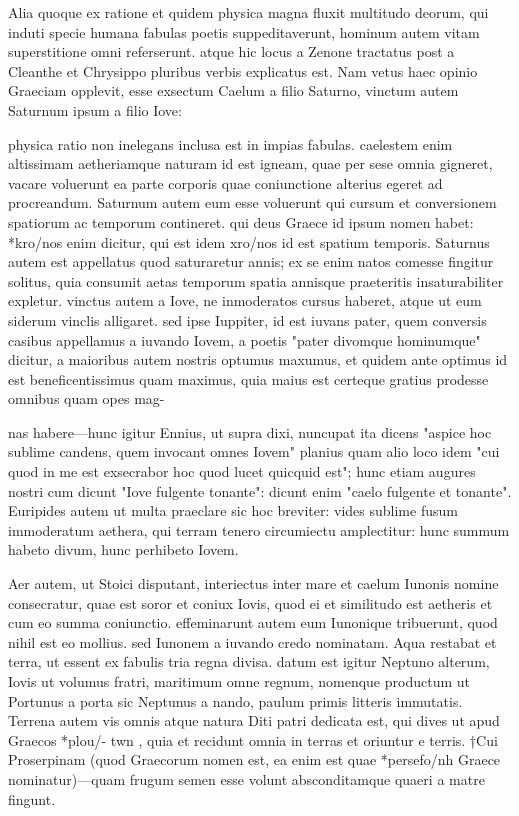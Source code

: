  Alia quoque ex ratione et quidem physica magna fluxit multitudo deorum, qui induti specie humana fabulas poetis suppeditaverunt, hominum autem vitam superstitione omni referserunt. atque hic locus a Zenone tractatus post a Cleanthe et Chrysippo pluribus verbis explicatus est. Nam vetus haec opinio Graeciam opplevit, esse exsectum Caelum a filio Saturno, vinctum autem Saturnum ipsum a filio Iove:

 physica ratio non inelegans inclusa est in impias fabulas. caelestem enim altissimam aetheriamque naturam id est igneam, quae per sese omnia gigneret, vacare voluerunt ea parte corporis quae coniunctione alterius egeret ad procreandum. Saturnum autem eum esse voluerunt qui cursum et conversionem spatiorum ac temporum contineret. qui deus Graece id ipsum nomen habet: *kro/nos enim dicitur, qui est idem xro/nos id est spatium temporis. Saturnus autem est appellatus quod saturaretur annis; ex se enim natos comesse fingitur solitus, quia consumit aetas temporum spatia annisque praeteritis insaturabiliter expletur. vinctus autem a Iove, ne inmoderatos cursus haberet, atque ut eum siderum vinclis alligaret. sed ipse Iuppiter, id est iuvans pater, quem conversis casibus appellamus a iuvando Iovem, a poetis "pater divomque hominumque" dicitur, a maioribus autem nostris optumus maxumus, et quidem ante optimus id est beneficentissimus quam maximus, quia maius est certeque gratius prodesse omnibus quam opes mag-

 nas habere—hunc igitur Ennius, ut supra dixi, nuncupat ita dicens "aspice hoc sublime candens, quem invocant omnes Iovem" planius quam alio loco idem "cui quod in me est exsecrabor hoc quod lucet quicquid est"; hunc etiam augures nostri cum dicunt "Iove fulgente tonante": dicunt enim "caelo fulgente et tonante". Euripides autem ut multa praeclare sic hoc breviter: vides sublime fusum immoderatum aethera, qui terram tenero circumiectu amplectitur: hunc summum habeto divum, hunc perhibeto Iovem.

 Aer autem, ut Stoici disputant, interiectus inter mare et caelum Iunonis nomine consecratur, quae est soror et coniux Iovis, quod ei et similitudo est aetheris et cum eo summa coniunctio. effeminarunt autem eum Iunonique tribuerunt, quod nihil est eo mollius. sed Iunonem a iuvando credo nominatam. Aqua restabat et terra, ut essent ex fabulis tria regna divisa. datum est igitur Neptuno alterum, Iovis ut volumus fratri, maritimum omne regnum, nomenque productum ut Portunus a porta sic Neptunus a nando, paulum primis litteris immutatis. Terrena autem vis omnis atque natura Diti patri dedicata est, qui dives ut apud Graecos *plou/- twn , quia et recidunt omnia in terras et oriuntur e terris. †Cui Proserpinam (quod Graecorum nomen est, ea enim est quae *persefo/nh Graece nominatur)—quam frugum semen esse volunt absconditamque quaeri a matre fingunt.

